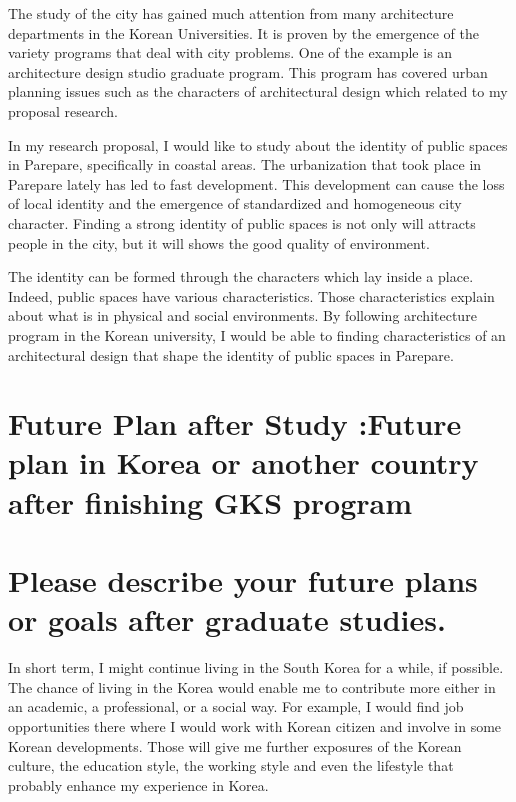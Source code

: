 \documentclass[12pt]{simart} %
\begin{document}
The study of the city has gained much attention from many architecture departments in the Korean Universities. It is proven by the emergence of the variety programs that deal with city problems. One of the example is an architecture design studio graduate program. This program has covered urban planning issues such as the characters of architectural design which related to my proposal research.

In my research proposal, I would like to study about the identity of public spaces in Parepare, specifically in coastal areas. The urbanization that took place in Parepare lately has led to fast development. This development can cause the loss of local identity and the emergence of standardized and homogeneous city character. Finding a strong identity of public spaces is not only will attracts people in the city, but it will shows the good quality of environment.

The identity can be formed through the characters which lay inside a place. Indeed, public spaces have various characteristics. Those characteristics explain about what is in physical and social environments. By following architecture program in the Korean university, I would be able to finding characteristics of an architectural design that shape the identity of public spaces in Parepare.


\section{Future Plan after Study :Future plan in Korea or another country after finishing GKS program}
\section*{Please describe your future plans or goals after graduate studies.}

In short term, I might continue living in the South Korea for a while, if possible. The chance of living in the Korea would enable me to contribute more either in an academic, a professional, or a social way. For example, I would find job opportunities there where I would work with Korean citizen and involve in some Korean developments. Those will give me further exposures of the Korean culture, the education style, the working style and even the lifestyle that probably enhance my experience in Korea.
\end{document}
